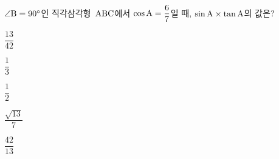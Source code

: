$\angle\mathrm{B}=90^\circ$인 직각삼각형~$\mathrm{ABC}$에서 $\cos\mathrm{A}=\dfrac{6}{7}$일 때, $\sin\mathrm{A}\times\tan\mathrm{A}$의 값은?
\begin{choices32}{\rule[-3ex]{0pt}{8ex}$\dfrac{13}{42}$}{\rule[-3ex]{0pt}{8ex}$\dfrac{1}{3}$}{\rule[-3ex]{0pt}{8ex}$\dfrac{1}{2}$}{\rule[-3ex]{0pt}{8ex}$\dfrac{\sqrt{13}}{7}$}{\rule[-3ex]{0pt}{8ex}$\dfrac{42}{13}$}\end{choices32}
